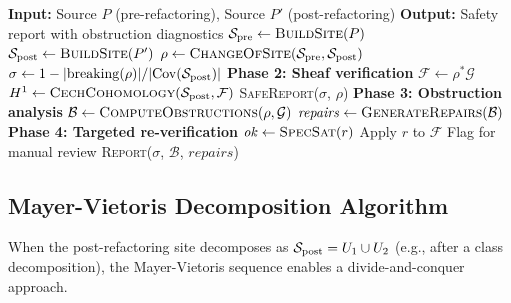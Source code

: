 \documentclass[11pt]{article}
\newcommand{\SitePre}{\Site_{\mathrm{pre}}}
\newcommand{\SitePost}{\Site_{\mathrm{post}}}
\newcommand{\RefactorMorph}{\rho}
\newcommand{\ObstructionSheaf}{\mathcal{B}}
\newcommand{\SafeDeg}{\sigma}                        %
\begin{document}
\begin{algorithm}[H]
\caption{Complete Refactoring Analysis Pipeline}
\label{alg:full-pipeline}
\begin{algorithmic}[1]
\STATE \textbf{Input:} Source $P$ (pre-refactoring), Source $P'$
       (post-refactoring)
\STATE \textbf{Output:} Safety report with obstruction diagnostics
\STATE $\SitePre \gets \textsc{BuildSite}(P)$
\STATE $\SitePost \gets \textsc{BuildSite}(P')$
\STATE $\RefactorMorph \gets \textsc{ChangeOfSite}(\SitePre, \SitePost)$
\STATE $\SafeDeg \gets 1 -
       |\mathrm{breaking}(\RefactorMorph)| / |\Cov(\SitePost)|$
\IF{$\SafeDeg = 1.0$}
  \STATE \textbf{Phase 2: Sheaf verification}
  \STATE $\mathcal{F} \gets \RefactorMorph^*\mathcal{G}$
  \STATE $H^1 \gets \textsc{CechCohomology}(\SitePost, \mathcal{F})$
    \RETURN \textsc{SafeReport}($\SafeDeg$, $\RefactorMorph$)
  \ENDIF
\ENDIF
\STATE \textbf{Phase 3: Obstruction analysis}
\STATE $\ObstructionSheaf \gets \textsc{ComputeObstructions}(
       \RefactorMorph, \mathcal{G})$
\STATE $\mathit{repairs} \gets \textsc{GenerateRepairs}(
       \ObstructionSheaf)$
\STATE \textbf{Phase 4: Targeted re-verification}
  \STATE $\mathit{ok} \gets \textsc{SpecSat}(r)$
    \STATE Apply $r$ to $\mathcal{F}$
  \ELSE
    \STATE Flag for manual review
  \ENDIF
\ENDFOR
\RETURN \textsc{Report}($\SafeDeg$, $\ObstructionSheaf$,
       $\mathit{repairs}$)
\end{algorithmic}
\end{algorithm}

\subsection{Mayer-Vietoris Decomposition Algorithm}\label{ssec:mv-algorithm}

When the post-refactoring site decomposes as $\SitePost = U_1 \cup U_2$
(e.g., after a class decomposition), the Mayer-Vietoris sequence enables
a divide-and-conquer approach.
\end{document}
